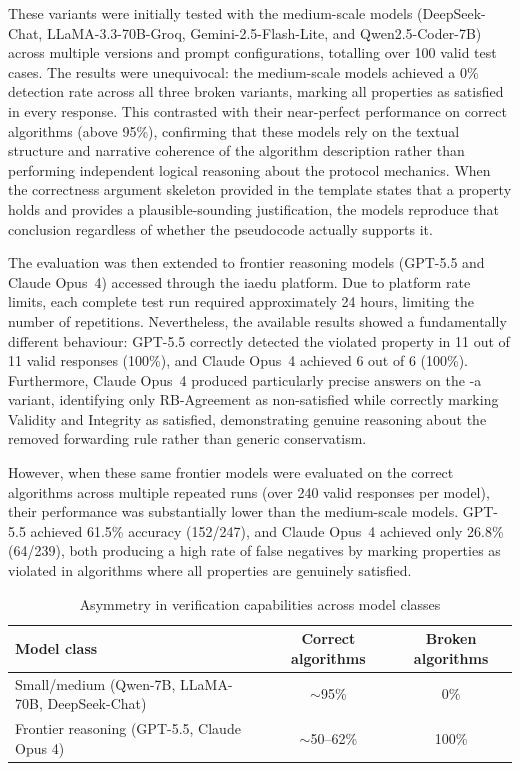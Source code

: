 These variants were initially tested with the medium-scale models (DeepSeek-Chat, LLaMA-3.3-70B-Groq, Gemini-2.5-Flash-Lite, and Qwen2.5-Coder-7B) across multiple versions and prompt configurations, totalling over 100 valid test cases. The results were unequivocal: the medium-scale models achieved a 0\% detection rate across all three broken variants, marking all properties as satisfied in every response. This contrasted with their near-perfect performance on correct algorithms (above 95\%), confirming that these models rely on the textual structure and narrative coherence of the algorithm description rather than performing independent logical reasoning about the protocol mechanics. When the correctness argument skeleton provided in the template states that a property holds and provides a plausible-sounding justification, the models reproduce that conclusion regardless of whether the pseudocode actually supports it.

The evaluation was then extended to frontier reasoning models (GPT-5.5 and Claude Opus~4) accessed through the iaedu platform. Due to platform rate limits, each complete test run required approximately 24 hours, limiting the number of repetitions. Nevertheless, the available results showed a fundamentally different behaviour: GPT-5.5 correctly detected the violated property in 11 out of 11 valid responses (100\%), and Claude Opus~4 achieved 6 out of 6 (100\%). Furthermore, Claude Opus~4 produced particularly precise answers on the -a variant, identifying only RB-Agreement as non-satisfied while correctly marking Validity and Integrity as satisfied, demonstrating genuine reasoning about the removed forwarding rule rather than generic conservatism.

However, when these same frontier models were evaluated on the correct algorithms across multiple repeated runs (over 240 valid responses per model), their performance was substantially lower than the medium-scale models. GPT-5.5 achieved 61.5\% accuracy (152/247), and Claude Opus~4 achieved only 26.8\% (64/239), both producing a high rate of false negatives by marking properties as violated in algorithms where all properties are genuinely satisfied.

\begin{table}[H]
\centering
\renewcommand{\arraystretch}{1.3}
\caption{Asymmetry in verification capabilities across model classes}
\label{tab:asymmetry}
\begin{tabular}{|l|c|c|}
\hline
\textbf{Model class} & \textbf{Correct algorithms} & \textbf{Broken algorithms} \\
\hline
Small/medium (Qwen-7B, LLaMA-70B, DeepSeek-Chat) & $\sim$95\% & 0\% \\
\hline
Frontier reasoning (GPT-5.5, Claude Opus 4) & $\sim$50--62\% & 100\% \\
\hline
\end{tabular}
\end{table}

